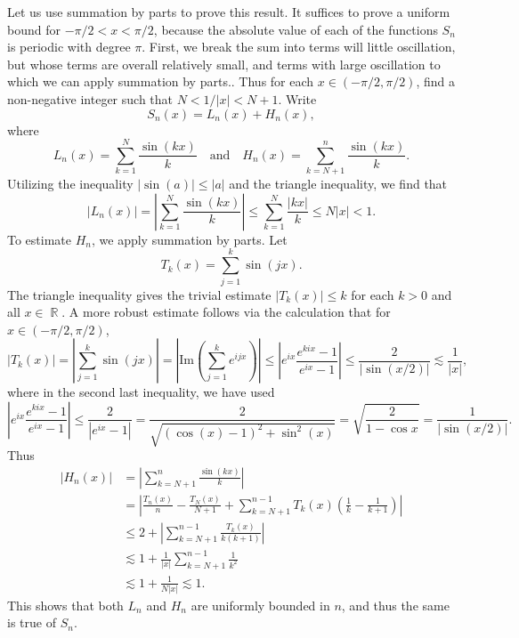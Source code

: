 \documentclass[answers]{exam}
\DeclareMathOperator{\RR}{\mathbb{R}}
\theoremstyle{problemstyle}
\newcommand{\1}[1]{\textbf{1}_{\left[#1\right]}} %
\begin{document}
\begin{questions}
\begin{solution}
Let us use summation by parts to prove this result. It suffices to prove a uniform bound for $-\pi/2 < x < \pi/2$, because the absolute value of each of the functions $S_n$ is periodic with degree $\pi$. First, we break the sum into terms will little oscillation, but whose terms are overall relatively small, and terms with large oscillation to which we can apply summation by parts.. Thus for each $x \in (-\pi/2,\pi/2)$, find a non-negative integer such that $N < 1/|x| < N+1$. Write
%
\[ S_n(x) = L_n(x) + H_n(x), \]
%
where
%
\[ L_n(x) = \sum_{k = 1}^N \frac{\sin(kx)}{k} \quad\text{and}\quad H_n(x) = \sum_{k = N+1}^n \frac{\sin(kx)}{k}. \]
%
Utilizing the inequality $|\sin(a)| \leq |a|$ and the triangle inequality, we find that
%
\begin{equation*}
  |L_n(x)| = \left| \sum_{k=1}^{N}\frac{\sin(kx)}{k} \right|\leq \sum_{k=1}^{N}\frac{|kx|}{k}\leq N|x|<1.
\end{equation*}
%
To estimate $H_n$, we apply summation by parts. Let
%
\[ T_k(x) = \sum_{j = 1}^k \sin(jx). \]
%
The triangle inequality gives the trivial estimate $|T_k(x)| \leq k$ for each $k > 0$ and all $x \in \RR$. A more robust estimate follows via the calculation that for $x \in (-\pi/2,\pi/2)$,
%
\begin{equation*}
  |T_k(x)| = \left| \sum_{j=1}^{k}\sin(jx) \right| = \left| \text{Im} \left( \sum_{j=1}^{k}e^{ijx} \right) \right|\leq \left| e^{ix} \frac{ e^{kix} - 1}{e^{ix} - 1}\right| \leq \frac{2}{|\sin (x/2)|} \lesssim \frac{1}{|x|},
\end{equation*}
%
where in the second last inequality, we have used
%
\begin{equation*}
  \left| e^{ix}\frac{e^{kix}-1}{e^{ix}-1} \right|
  \leq \frac{2}{\left| e^{ix}-1 \right|}
  = \frac{2}{\sqrt{( \cos(x)-1 )^{2}+ \sin^{2}(x)}}
  = \sqrt{\frac{2}{1-\cos x}}
  = \frac{1}{|\sin (x/2)|}.
\end{equation*}
%
Thus
%
\begin{align*}
  |H_n(x)| &= \left| \sum_{k=N+1}^{n}\frac{\sin(kx)}{k} \right|\\
          &= \left| \frac{T_n(x)}{n}-\frac{T_N(x)}{N+1} + \sum_{k=N+1}^{n-1}T_k(x) \left(\frac{1}{k}-\frac{1}{k+1}  \right) \right|\\
         &\leq 2 + \left| \sum_{k=N+1}^{n-1}\frac{T_k(x)}{k(k+1)} \right|\\
         &\lesssim 1 + \frac{1}{|x|} \sum_{k = N+1}^{n-1} \frac{1}{k^2}\\
         &\lesssim 1 + \frac{1}{N |x|} \lesssim 1.
\end{align*}
%
This shows that both $L_n$ and $H_n$ are uniformly bounded in $n$, and thus the same is true of $S_n$.


\end{solution}
\end{questions}
\end{document}
